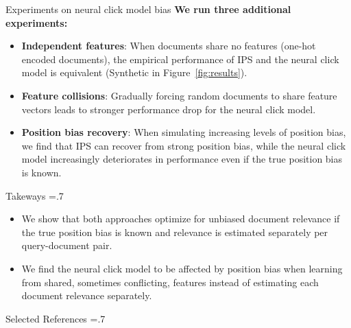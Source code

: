 \documentclass[final]{beamer}
\newlength{\onecolwid}
\begin{document}
\begin{frame}[t]
\begin{columns}[t]
\begin{column}{\onecolwid}
\begin{block}{Experiments on neural click model bias}
		{\bf We run three additional experiments:}
		\begin{itemize}
			\item {\bf Independent features}: When documents share no features (one-hot encoded documents), the empirical performance of IPS and the neural click model is equivalent (Synthetic in Figure~\ref{fig:results}).
			\item {\bf Feature collisions}: Gradually forcing random documents to share feature vectors leads to stronger performance drop for the neural click model.
			\item {\bf Position bias recovery}: When simulating increasing levels of position bias, we find that IPS can recover from strong position bias, while the neural click model increasingly deteriorates in performance even if the true position bias is known.
		\end{itemize}

	\end{block}

	\vspace{2ex}

	\begin{alertblock}{Takeways}
		\baselineskip=.7\baselineskip
	
		\begin{itemize}
			\item We show that both approaches optimize for unbiased document relevance if the true position bias is known and relevance is estimated separately per query-document pair.
			\item We find the neural click model to be affected by position bias when learning from shared, sometimes conflicting, features instead of estimating each document relevance separately.
		\end{itemize}

	\end{alertblock}


	\vspace{2ex}

	\begin{block}{Selected References}
		\baselineskip=.7\baselineskip
		
		
	\end{block}


\end{column}
\end{columns}
\end{frame}
\end{document}
